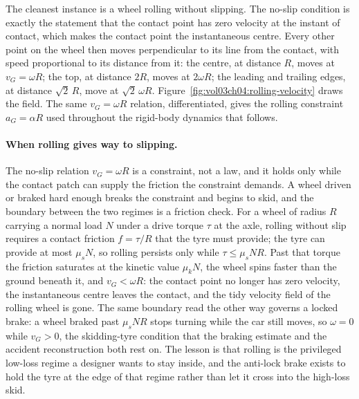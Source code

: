 The cleanest instance is a wheel rolling without slipping. The no-slip
condition is exactly the statement that the contact point has zero
velocity at the instant of contact, which makes the contact point the
instantaneous centre. Every other point on the wheel then moves
perpendicular to its line from the contact, with speed proportional to
its distance from it: the centre, at distance $R$, moves at
$v_{G}=\omega R$; the top, at distance $2R$, moves at $2\omega R$; the
leading and trailing edges, at distance $\sqrt{2}\,R$, move at
$\sqrt{2}\,\omega R$. Figure~\ref{fig:vol03ch04:rolling-velocity}
draws the field. The same $v_{G}=\omega R$ relation, differentiated,
gives the rolling constraint $a_{G}=\alpha R$ used throughout the
rigid-body dynamics that follows.



\paragraph{When rolling gives way to slipping.} The no-slip relation
$v_{G}=\omega R$ is a constraint, not a law, and it holds only while the
contact patch can supply the friction the constraint demands. A wheel
driven or braked hard enough breaks the constraint and begins to skid,
and the boundary between the two regimes is a friction check. For a
wheel of radius $R$ carrying a normal load $N$ under a drive torque
$\tau$ at the axle, rolling without slip requires a contact friction
$f=\tau/R$ that the tyre must provide; the tyre can provide at most
$\mu_{s}N$, so rolling persists only while $\tau\le\mu_{s}NR$. Past that
torque the friction saturates at the kinetic value $\mu_{k}N$, the wheel
spins faster than the ground beneath it, and $v_{G}<\omega R$: the
contact point no longer has zero velocity, the instantaneous centre
leaves the contact, and the tidy velocity field of the rolling wheel is
gone. The same boundary read the other way governs a locked brake: a
wheel braked past $\mu_{s}NR$ stops turning while the car still moves, so
$\omega=0$ while $v_{G}>0$, the skidding-tyre condition that the braking
estimate and the accident reconstruction both rest on. The lesson is
that rolling is the privileged low-loss regime a designer wants to stay
inside, and the anti-lock brake exists to hold the tyre at the edge of
that regime rather than let it cross into the high-loss skid.

